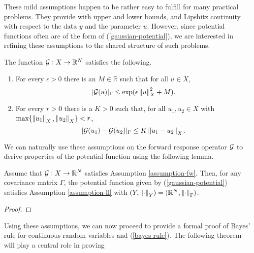 These mild assumptions happen to be rather easy to fulfill for many practical problems. They provide with upper and lower bounds, and Lipshitz continuity with respect to the data $y$ and the parameter $u$.  However, since potential functions often are of the form of (\ref{gaussian-potential}), we are interested in refining these assumptions to the shared structure of such problems.

\begin{assumption}\label{assumption-fw}
  The function $\mathcal{G} : X \rightarrow \mathbb{R}^N$ satisfies the following.

  \begin{enumerate}
  \item For every $\epsilon > 0$ there is an $M \in \mathbb{R}$ such that for all $u \in X$,
    \begin{equation*}
      |\mathcal{G}(u)|_\Gamma \le \exp(\epsilon \left\lVert u\right\rVert_X^2 + M).
    \end{equation*}
  \item For every $r > 0$ there is a $K > 0$ such that, for all $u_1, u_2 \in X$ with $\text{max}\{\left\lVert u_1\right\rVert_X, \left\lVert u_2\right\rVert_X\} < r$,
    \begin{equation*}
      |\mathcal{G}(u_1) - \mathcal{G}(u_2)|_\Gamma \le K\left\lVert u_1 - u_2\right\rVert_X.
    \end{equation*}
  \end{enumerate}
\end{assumption}

We can naturally use these assumptions on the forward response operator $\mathcal{G}$ to derive properties of the potential function using the following lemma.

\begin{lemma} \label{fw-implies-ll}
  Assume that $\mathcal{G}  : X \rightarrow \mathbb{R}^N$ satisfies Assumption \ref{assumption-fw}. Then, for any covariance matrix $\Gamma$, the potential function given by (\ref{gaussian-potential}) satisfies Assumption \ref{assumption-ll} with $(Y, \left\lVert\cdot\right\rVert_Y) = (\mathbb{R}^N, \left\lVert\cdot\right\rVert_\Gamma)$.
\end{lemma}

\begin{proof} 
\end{proof}

Using these assumptions, we can now proceed to provide a formal proof of Bayes' rule for continuous random variables and (\ref{bayes-rule}). The following theorem will play a central role in proving

